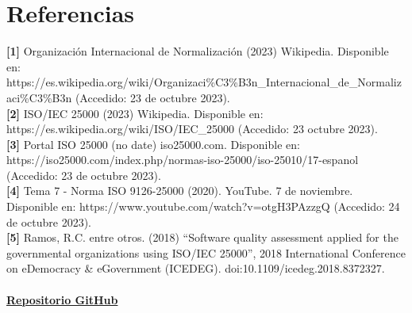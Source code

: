\documentclass[https://www.overleaf.com/project/63761df255a8a9f4a15c3579
	letterpaper, %
	10pt, %
]{CSUniSchoolLabReport}
\begin{document}
    \section{Referencias}
        \textbf{[1]}\hspace{0.5em} Organización Internacional de Normalización (2023) Wikipedia. Disponible en: https://es.wikipedia.org/wiki/Organizaci\%C3\%B3n_Internacional_de_Normalizaci\%C3\%B3n (Accedido: 23 de octubre 2023).
        \\
        \textbf{[2]}\hspace{0.5em} ISO/IEC 25000 (2023) Wikipedia. Disponible en: https://es.wikipedia.org/wiki/ISO/IEC_25000 (Accedido: 23 octubre 2023).
        \\
        \textbf{[3]}\hspace{0.5em} Portal ISO 25000 (no date) iso25000.com. Disponible en: https://iso25000.com/index.php/normas-iso-25000/iso-25010/17-espanol (Accedido: 23 de octubre  2023).
        \\
        \textbf{[4]}\hspace{0.5em} Tema 7 - Norma ISO 9126-25000 (2020). YouTube. 7 de noviembre. Disponible en: https://www.youtube.com/watch?v=otgH3PAzzgQ (Accedido: 24 de octubre 2023).
        \\
        \textbf{[5]}\hspace{0.5em} Ramos, R.C. entre otros. (2018) “Software quality assessment applied for the governmental organizations using ISO/IEC 25000”, 2018 International Conference on eDemocracy & eGovernment (ICEDEG). doi:10.1109/icedeg.2018.8372327.\\\\

    
    \href{https://github.com/DAOBLUR/CompilersPractices/tree/main/partial} {\huge\faGithub \textbf{{Repositorio GitHub}} }
    
\end{document}

